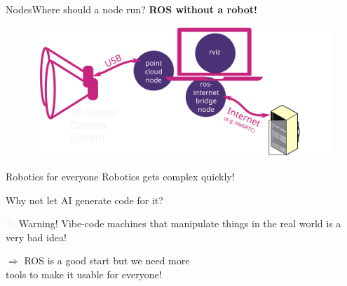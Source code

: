 \documentclass[aspectratio=169]{beamer}
\begin{document}
  \begin{frame}{Nodes}{Where should a node run?}
    \textbf{ROS without a robot!}
      \begin{figure}[tbh!]
        \centering
        \includegraphics[width=.9\textwidth]{./figures/ros_nodes_example_3.pdf}
      \end{figure}

  \end{frame}



\begin{frame}{Robotics for everyone}
    \centering
      Robotics gets complex quickly!\\
      \pause
      
      \vspace{1em}
      Why not let AI generate code for it?
  
      \begin{minipage}{0.6\textwidth}
          \begin{alertblock}{\includegraphics[height=1em]{figures/hare_head_darkmode.pdf} Warning!}
              Vibe-code machines that manipulate things in the real world is a very bad idea!
          \end{alertblock}
  \end{minipage}

  \vspace{1em}
  $\Rightarrow$ ROS is a good start but we need more\\tools to make it usable for everyone!
\end{frame}
  
\end{document}
